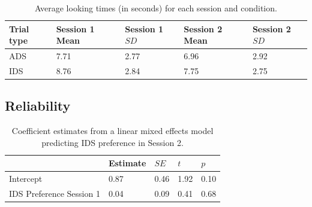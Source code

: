 \documentclass[
  man,floatsintext]{apa6}
\begin{document}
\begin{table}[tbp]

\begin{center}
\begin{threeparttable}

\caption{\label{tab:descriptives_table1}Average looking times (in seconds) for each session and condition.}

\begin{tabular}{lllll}
\toprule
Trial type & Session 1 Mean & Session 1 $SD$ & Session 2 Mean & Session 2 $SD$\\
\midrule
ADS & 7.71 & 2.77 & 6.96 & 2.92\\
IDS & 8.76 & 2.84 & 7.75 & 2.75\\
\bottomrule
\end{tabular}

\end{threeparttable}
\end{center}

\end{table}

\hypertarget{reliability}{%
\subsection{Reliability}\label{reliability}}

\begin{table}[tbp]

\begin{center}
\begin{threeparttable}

\caption{\label{tab:coef_table2}Coefficient estimates from a linear mixed effects model predicting IDS preference in Session 2.}

\begin{tabular}{lllll}
\toprule
 & Estimate & $SE$ & $t$ & $p$\\
\midrule
Intercept & 0.87 & 0.46 & 1.92 & 0.10\\
IDS Preference Session 1 & 0.04 & 0.09 & 0.41 & 0.68\\
\bottomrule
\end{tabular}

\end{threeparttable}
\end{center}

\end{table}
\end{document}
